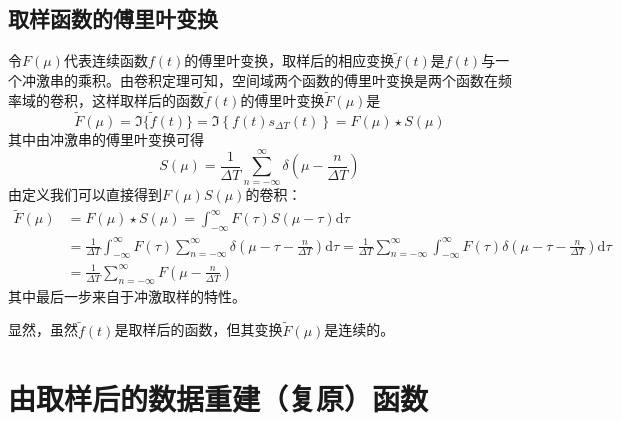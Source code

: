 \documentclass[UTF8,a4paper]{ctexart}
\begin{document}
\subsection{取样函数的傅里叶变换}
令$F(\mu)$代表连续函数$f(t)$的傅里叶变换，取样后的相应变换$\tilde{f}(t)$是$f(t)$与一个冲激串的乘积。由卷积定理可知，空间域两个函数的傅里叶变换是两个函数在频率域的卷积，这样取样后的函数$\tilde{f}(t)$的傅里叶变换$\tilde{F}(\mu)$是
\begin{equation}\tilde{F}(\mu)=\Im\{\tilde{f}(t)\}=\Im\left\{f(t) s_{\Delta T}(t)\right\}=F(\mu) \star S(\mu)\end{equation}
其中由冲激串的傅里叶变换可得
\begin{equation}S(\mu)=\frac{1}{\Delta T} \sum_{n=-\infty}^{\infty} \delta\left(\mu-\frac{n}{\Delta T}\right)\end{equation}
由定义我们可以直接得到$F(\mu)$$S(\mu)$的卷积：
	\begin{equation}\begin{aligned}
			\tilde{F}(\mu) & =F(\mu) \star S(\mu)=\int_{-\infty}^{\infty} F(\tau) S(\mu-\tau) \mathrm{d} \tau                                                                                                                                                                                                         \\
			               & =\frac{1}{\Delta T} \int_{-\infty}^{\infty} F(\tau) \sum_{n=-\infty}^{\infty} \delta\left(\mu-\tau-\frac{n}{\Delta T}\right) \mathrm{d} \tau=\frac{1}{\Delta T} \sum_{n=-\infty}^{\infty} \int_{-\infty}^{\infty} F(\tau) \delta\left(\mu-\tau-\frac{n}{\Delta T}\right) \mathrm{d} \tau \\
			               & =\frac{1}{\Delta T} \sum_{n=-\infty}^{\infty} F\left(\mu-\frac{n}{\Delta T}\right)
		\end{aligned}\end{equation}
	其中最后一步来自于冲激取样的特性。\par
	显然，虽然$\tilde{f}(t)$是取样后的函数，但其变换$\tilde{F}(\mu)$是连续的。
	\section{由取样后的数据重建（复原）函数\cite{Gonzalez.2009}}
\end{document}
